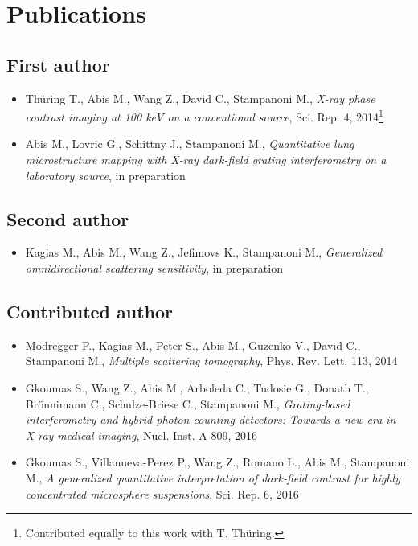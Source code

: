 \chapter*{Publications}
\section*{First author}
\begin{itemize}
    \item Th\"uring T., Abis M., Wang Z., David C., Stampanoni M.,
        \emph{X-ray phase contrast imaging at 100 keV on a conventional
        source}, Sci. Rep. 4, 2014\footnote{Contributed equally to this work
        with T. Th\"uring.}
    \item Abis M., Lovric G., Schittny J., Stampanoni
    M., \emph{Quantitative lung microstructure mapping with X-ray dark-field
    grating interferometry on a laboratory source}, in preparation
\end{itemize}
\section*{Second author}
\begin{itemize}
    \item Kagias M., Abis M., Wang Z., Jefimovs K., Stampanoni M.,
        \emph{Generalized omnidirectional scattering sensitivity}, in
        preparation
\end{itemize}
\section*{Contributed author}
\begin{itemize}
    \item Modregger P., Kagias M., Peter S., Abis M., Guzenko V., David C.,
        Stampanoni M., \emph{Multiple scattering tomography}, Phys. Rev.
        Lett. 113, 2014
    \item Gkoumas S., Wang Z., Abis M., Arboleda C., Tudosie G., Donath T.,
        Br\"onnimann C., Schulze-Briese C., Stampanoni M.,
        \emph{Grating-based interferometry and hybrid photon counting
        detectors: Towards a new era in X-ray medical imaging}, Nucl. Inst.
        A 809, 2016
    \item Gkoumas S., Villanueva-Perez P., Wang Z., Romano L., Abis M.,
        Stampanoni M., \emph{A generalized quantitative interpretation of
        dark-field contrast for highly concentrated microsphere
    suspensions}, Sci. Rep. 6, 2016
\end{itemize}
